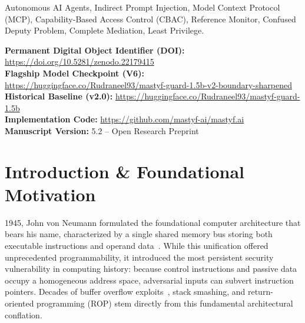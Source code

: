 \documentclass[10pt,journal,compsoc]{IEEEtran}
\begin{document}
{\begin{abstract}
matching the unprotected base agent, and 100\% defense across 500 targeted adaptive red-team trials. Finally, we systemize the runtime into the Mastyf Security Gateway: the evaluated research runtime was v0.1.0-RC1 (verifying 38/38 security invariant tests), while the subsequently hardened commercial-pilot runtime is v0.1.1-rc1 (verifying 50/50 tests), establishing complete mediation non-executability ($\text{Decision} \in \{\text{BLOCK}, \text{ESCALATE}\} \implies \text{BackendToolInvocations} = 0$) and $>330,000$~req/s reference monitor throughput under an Ed25519-signed release manifest. We contextualize Mastyf as an empirically evaluated pre-production architecture, highlighting residual risks and outlining requirements for broader production-scale validation.
\end{abstract}

\begin{IEEEkeywords}
Autonomous AI Agents, Indirect Prompt Injection, Model Context Protocol (MCP), Capability-Based Access Control (CBAC), Reference Monitor, Confused Deputy Problem, Complete Mediation, Least Privilege.
\end{IEEEkeywords}}

\maketitle
\IEEEdisplaynontitleabstractindextext
\IEEEpeerreviewmaketitle

\noindent\textbf{Permanent Digital Object Identifier (DOI):} \url{https://doi.org/10.5281/zenodo.22179415}\\
\textbf{Flagship Model Checkpoint (V6):} \url{https://huggingface.co/Rudraneel93/mastyf-guard-1.5b-v2-boundary-sharpened}\\
\textbf{Historical Baseline (v2.0):} \url{https://huggingface.co/Rudraneel93/mastyf-guard-1.5b}\\
\textbf{Implementation Code:} \url{https://github.com/mastyf-ai/mastyf.ai}\\
\textbf{Manuscript Version:} 5.2 -- Open Research Preprint

\section{Introduction \& Foundational Motivation}
 1945, John von Neumann formulated the foundational computer architecture that bears his name, characterized by a single shared memory bus storing both executable instructions and operand data~\cite{ref_1}. While this unification offered unprecedented programmability, it introduced the most persistent security vulnerability in computing history: because control instructions and passive data occupy a homogeneous address space, adversarial inputs can subvert instruction pointers. Decades of buffer overflow exploits~\cite{ref_2}, stack smashing, and return-oriented programming (ROP) stem directly from this fundamental architectural conflation.
\end{document}
